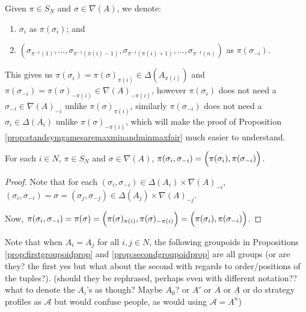 Given $\pi \in S_N$ and $\sigma \in \nabla(A)$, we denote:
\begin{enumerate}
	\item $\sigma_i$ as $\pi(\sigma_i)$; and
	\item $(\sigma_{\pi^{-1}(1)}, \ldots, \sigma_{\pi^{-1}\left(\pi(i)-1\right)}, \sigma_{\pi^{-1}\left(\pi(i)+1\right)}, \ldots, \sigma_{\pi^{-1}(n)})$ as $\pi(\sigma_{-i})$.
\end{enumerate}
This gives us $\pi(\sigma_i) = \pi(\sigma)_{\pi(i)} \in \Delta(A_{\pi(i)})$ and $\pi(\sigma_{-i}) = \pi(\sigma)_{-\pi(i)} \in {\nabla(A)}_{-\pi(i)}$, however $\pi(\sigma_i)$ does not need a $\sigma_{-i} \in {\nabla(A)}_{-i}$ unlike $\pi(\sigma)_{\pi(i)}$, similarly $\pi(\sigma_{-i})$ does not need a $\sigma_i \in \Delta(A_i)$ unlike $\pi(\sigma)_{-\pi(i)}$, which will make the proof of Proposition \ref{prop:standsymgamesaremaxminandminmaxfair} much easier to understand.

\begin{proposition}
	For each $i \in N$, $\pi \in S_N$ and $\sigma \in \nabla(A)$, $\pi(\sigma_i, \sigma_{-i}) = \Bigl(\pi(\sigma_i), \pi(\sigma_{-i})\Bigr)$.
	
	\begin{proof}
		Note that for each $(\sigma_i, \sigma_{-i}) \in \Delta(A_i)\times{\nabla(A)}_{-i}$, $(\sigma_i, \sigma_{-i}) = \sigma = (\sigma_j, \sigma_{-j}) \in \Delta(A_j)\times{\nabla(A)}_{-j}$.
		
		Now, $\pi(\sigma_i, \sigma_{-i}) = \pi(\sigma) = \Bigl(\pi(\sigma)_{\pi(i)}, \pi(\sigma)_{-\pi(i)}\Bigr) = \Bigl(\pi(\sigma_i), \pi(\sigma_{-i})\Bigr)$.
	\end{proof}
\end{proposition}

Note that when $A_i = A_j$ for all $i, j \in N$, the following groupoids in Propositions \ref{prop:firstgroupoidprop} and \ref{prop:secondgroupoidprop} are all groups (or are they? the first yes but what about the second with regards to order/positions of the tuples?). (should they be rephrased, perhaps even with different notation?? what to denote the $A_i$'s as though? Maybe $A_0$? or $A'$ or $\overline{A}$ or $\underline{A}$ or do strategy profiles as $\mathcal{A}$ but would confuse people, as would using $\mathcal{A} = A^n$)


